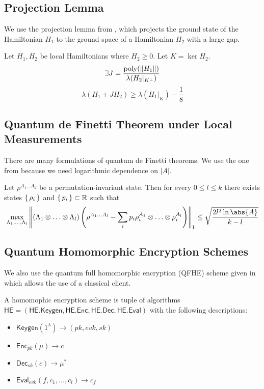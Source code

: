\subsection{Projection Lemma}

We use the projection lemma from \cite{kempe_kitaev_regev_2006}, which projects the ground state of the Hamiltonian $H_1$ to the ground space of a Hamiltonian $H_2$ with a large gap.

\begin{theorem}
	Let $H_1, H_2$ be local Hamiltonians where $H_2\geq0$. Let $K=\ker H_2$.
	$$\exists J=\frac{\operatorname*{\operatorname{poly}}(\left\lVert H_1\right\rVert)}{\lambda(H_2|_{K^\bot})}$$
	$$\lambda(H_1+JH_2)\geq\lambda(H_1\big|_K)-\frac{1}{8}$$
\end{theorem}

\subsection{Quantum de Finetti Theorem under Local Measurements}

There are many formulations of quantum de Finetti theorems. We use the one from \cite{Brandão2017} because we need logarithmic dependence on $|A|$.
\begin{theorem}
	\label{deFinetti}
	Let $\rho^{A_1\ldots A_k}$ be a permutation-invariant state. Then for every $0\leq l\leq k$ there exists states $\set{\rho_i}$ and $\set{p_i}\subset\mathbb{R}$ such that
	$$\max_{\Lambda_1,\ldots,\Lambda_l}\norm{(\Lambda_1\otimes\ldots\otimes\Lambda_l)\left(\rho^{A_1\ldots A_l}-\sum_ip_i\rho_i^{A_1}\otimes\ldots\otimes\rho_i^{A_l}\right)}_1\leq\sqrt{\frac{2l^2\ln\abs{A}}{k-l}}$$
\end{theorem}

\subsection{Quantum Homomorphic Encryption Schemes}

We also use the quantum full homomorphic encryption (QFHE) scheme given in \cite{mahadev_qfhe} which allows the use of a classical client.

\begin{dfn}
	A homomophic encryption scheme is tuple of algorithms $\mathsf{HE}=(\mathsf{HE.Keygen}, \mathsf{HE.Enc}, \mathsf{HE.Dec}, \mathsf{HE.Eval})$ with the following descriptions:
	\begin{itemize}
		\item $\mathsf{Keygen}(1^\lambda)\rightarrow(pk, evk, sk)$
		\item $\mathsf{Enc}_{pk}(\mu)\rightarrow c$
		\item $\mathsf{Dec}_{sk}(c)\rightarrow \mu^*$
		\item $\mathsf{Eval}_{evk}(f, c_1, \ldots, c_l)\rightarrow c_f$
	\end{itemize}
\end{dfn}

